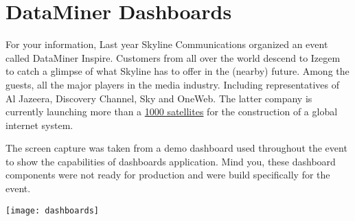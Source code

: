 \chapter{DataMiner Dashboards}
\label{dataminer_dashboards}

For your information, Last year Skyline Communications organized an event called DataMiner Inspire. Customers from all over the world descend to Izegem to catch a glimpse of what Skyline has to offer in the (nearby) future. Among the guests, all the major players in the media industry. Including representatives of Al Jazeera, Discovery Channel, Sky and OneWeb. The latter company is currently launching more than a \underline{1000 satellites} for the construction of a global internet system.

The screen capture was taken from a demo dashboard used throughout the event to show the capabilities of dashboards application. Mind you, these dashboard components were not ready for production and were build specifically for the event. 
\begin{center}
\texttt{[image: dashboards]}
\end{center}
